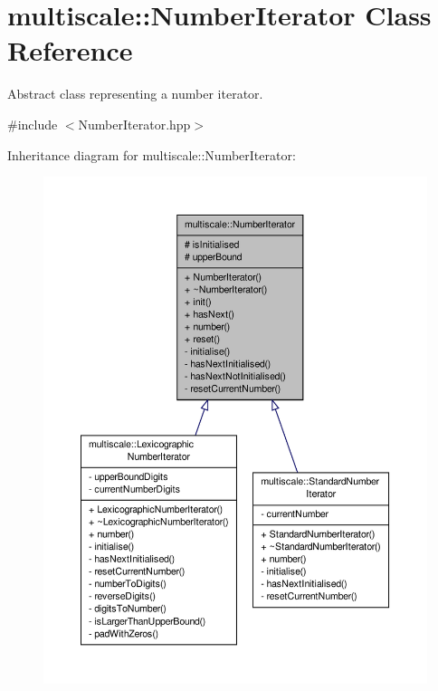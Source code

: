\hypertarget{classmultiscale_1_1NumberIterator}{\section{multiscale\-:\-:Number\-Iterator Class Reference}
\label{classmultiscale_1_1NumberIterator}
}


Abstract class representing a number iterator.  




{\ttfamily \#include $<$Number\-Iterator.\-hpp$>$}



Inheritance diagram for multiscale\-:\-:Number\-Iterator\-:\nopagebreak
\begin{figure}[H]
\begin{center}
\leavevmode
\includegraphics[width=350pt]{classmultiscale_1_1NumberIterator__inherit__graph}
\end{center}
\end{figure}


